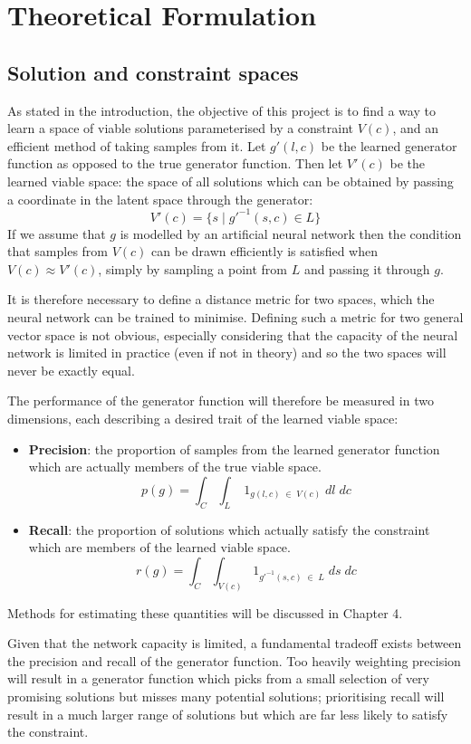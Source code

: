 \documentclass[../../main.tex]{subfiles}
\begin{document}
\chapter{Theoretical Formulation}

\section{Solution and constraint spaces}

As stated in the introduction, the objective of this project is to find a way to learn a space of viable solutions parameterised by a constraint $V(c)$, and an efficient method of taking samples from it.
Let $g'(l, c)$ be the learned generator function as opposed to the true generator function.
Then let $V'(c)$ be the learned viable space: the space of all solutions which can be obtained by passing a coordinate in the latent space through the generator:
$$V'(c) = \{s \; | \; g'^{-1}(s, c) \in L\}$$
If we assume that $g$ is modelled by an artificial neural network then the condition that samples from $V(c)$ can be drawn efficiently is satisfied when $V(c) \approx V'(c)$, simply by sampling a point from $L$ and passing it through $g$.

It is therefore necessary to define a distance metric for two spaces, which the neural network can be trained to minimise.
Defining such a metric for two general vector space is not obvious, especially considering that the capacity of the neural network is limited in practice (even if not in theory) and so the two spaces will never be exactly equal.

The performance of the generator function will therefore be measured in two dimensions, each describing a desired trait of the learned viable space:
\begin{itemize}
    \item[] \textbf{Precision}: the proportion of samples from the learned generator function which are actually members of the true viable space.
    $$p(g) = \int_{C}\int_{L} \; 1_{g(l, c) \; \in \; V(c)} \; dl \; dc$$ 
    \item[] \textbf{Recall}: the proportion of solutions which actually satisfy the constraint which are members of the learned viable space.
    $$r(g) = \int_{C}\int_{V(c)} 1_{g'^{-1}(s, c) \; \in \; L} \; ds \; dc$$ 
\end{itemize}
Methods for estimating these quantities will be discussed in Chapter 4.

Given that the network capacity is limited, a fundamental tradeoff exists between the precision and recall of the generator function.
Too heavily weighting precision will result in a generator function which picks from a small selection of very promising solutions but misses many potential solutions; prioritising recall will result in a much larger range of solutions but which are far less likely to satisfy the constraint.
\end{document}
